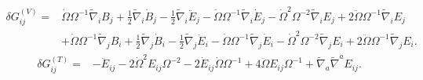 \documentclass[10pt,letterpaper]{article}
\begin{document}
\begin{align}
\delta G_{ij}^{(V)}={}&\dot{\Omega} \Omega^{-1} \tilde{\nabla}_{i}B_{j}
 + \tfrac{1}{2} \tilde{\nabla}_{i}\dot{B}_{j}
 -  \tfrac{1}{2} \tilde{\nabla}_{i}\ddot{E}_{j}
 -  \dot{\Omega} \Omega^{-1} \tilde{\nabla}_{i}\dot{E}_{j}
 -  \dot{\Omega}^2 \Omega^{-2} \tilde{\nabla}_{i}E_{j}
 + 2 \ddot{\Omega} \Omega^{-1} \tilde{\nabla}_{i}E_{j}\nonumber\\
& + \dot{\Omega} \Omega^{-1} \tilde{\nabla}_{j}B_{i}
 + \tfrac{1}{2} \tilde{\nabla}_{j}\dot{B}_{i}
 -  \tfrac{1}{2} \tilde{\nabla}_{j}\ddot{E}_{i}
 -  \dot{\Omega} \Omega^{-1} \tilde{\nabla}_{j}\dot{E}_{i}
 -  \dot{\Omega}^2 \Omega^{-2} \tilde{\nabla}_{j}E_{i}
 + 2 \ddot{\Omega} \Omega^{-1} \tilde{\nabla}_{j}E_{i}.
\end{align}
\begin{align}
\delta G_{ij}^{(T)}={}&- \ddot{E}_{ij}
 - 2 \dot{\Omega}^2 E_{ij} \Omega^{-2}
 - 2 \dot{E}_{ij} \dot{\Omega} \Omega^{-1}
 + 4 \ddot{\Omega} E_{ij} \Omega^{-1}
 + \tilde{\nabla}_{a}\tilde{\nabla}^{a}E_{ij}.
\end{align}
\end{document}
